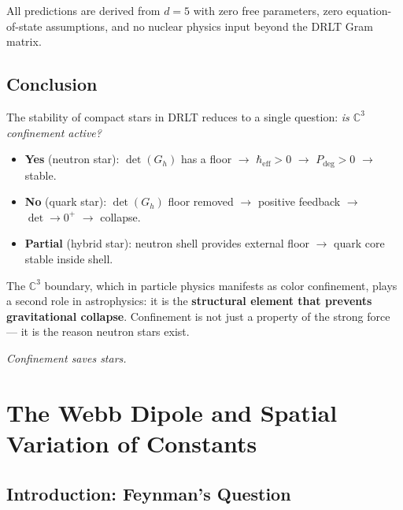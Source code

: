 \documentclass[12pt]{article}
\theoremstyle{remark}
\theoremstyle{definition}
\newcommand{\CC}{\mathbb{C}}
\begin{document}
All predictions are derived from $d = 5$ with zero free parameters, zero equation-of-state assumptions, and no nuclear physics input beyond the DRLT Gram matrix.

\subsection{Conclusion}

The stability of compact stars in DRLT reduces to a single question: \emph{is $\CC^3$ confinement active?}

\begin{itemize}
\item \textbf{Yes} (neutron star): $\det(G_h)$ has a floor $\to$ $\hbar_\text{eff} > 0$ $\to$ $P_\text{deg} > 0$ $\to$ stable.
\item \textbf{No} (quark star): $\det(G_h)$ floor removed $\to$ positive feedback $\to$ $\det \to 0^+$ $\to$ collapse.
\item \textbf{Partial} (hybrid star): neutron shell provides external floor $\to$ quark core stable inside shell.
\end{itemize}

The $\CC^3$ boundary, which in particle physics manifests as color confinement, plays a second role in astrophysics: it is the \textbf{structural element that prevents gravitational collapse}. Confinement is not just a property of the strong force --- it is the reason neutron stars exist.

\begin{center}
\emph{Confinement saves stars.}
\end{center}

\section{The Webb Dipole and Spatial Variation of Constants}
\label{ch:webb_dipole}

\subsection{Introduction: Feynman's Question}
\end{document}
